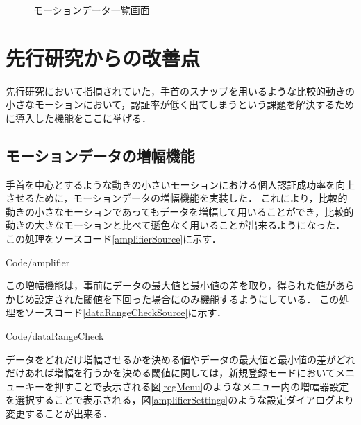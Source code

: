 \documentclass[11pt]{jreport}
\renewcommand{\slash}{/}
\begin{document}
\begin{figure}[tbp]
\begin{minipage}{0.5\hsize}
\begin{center}
                \end{center}
                \caption{モーションデータ一覧画面}
                \label{dataList}
            \end{minipage}
        \end{figure}

    \section{先行研究からの改善点}
    先行研究において指摘されていた，手首のスナップを用いるような比較的動きの小さなモーションにおいて，認証率が低く出てしまうという課題を解決するために導入した機能をここに挙げる．

        \subsection{モーションデータの増幅機能}
        手首を中心とするような動きの小さいモーションにおける個人認証成功率を向上させるために，モーションデータの増幅機能を実装した．
        これにより，比較的動きの小さなモーションであってもデータを増幅して用いることができ，比較的動きの大きなモーションと比べて遜色なく用いることが出来るようになった．
        この処理をソースコード\ref{amplifierSource}に示す．

        
        {Code\slash amplifier}

        この増幅機能は，事前にデータの最大値と最小値の差を取り，得られた値があらかじめ設定された閾値を下回った場合にのみ機能するようにしている．
        この処理をソースコード\ref{dataRangeCheckSource}に示す．

        
        {Code\slash dataRangeCheck}

        データをどれだけ増幅させるかを決める値やデータの最大値と最小値の差がどれだけあれば増幅を行うかを決める閾値に関しては，新規登録モードにおいてメニューキーを押すことで表示される図\ref{regMenu}のようなメニュー内の増幅器設定を選択することで表示される，図\ref{amplifierSettings}のような設定ダイアログより変更することが出来る．
\end{document}
